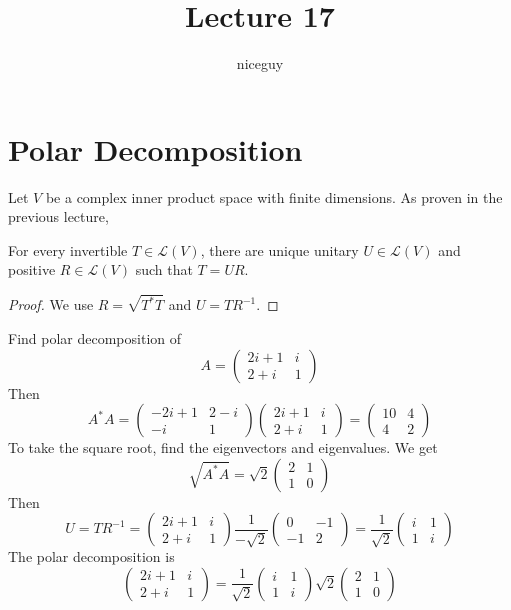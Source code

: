 \documentclass[12pt]{article}
\author{niceguy}
\title{Lecture 17}
\begin{document}
\maketitle

\section{Polar Decomposition}

Let $V$ be a complex inner product space with finite dimensions. As proven in the previous lecture,

\begin{thm}
	For every invertible $T \in \mathcal L(V)$, there are unique unitary $U \in \mathcal L(V)$ and positive $R \in \mathcal L(V)$ such that $T=UR$.
\end{thm}

\begin{proof}
	We use $R=\sqrt{T^*T}$ and $U=TR^{-1}$.
\end{proof}

\begin{ex}
	Find polar decomposition of
	$$A = \begin{pmatrix} 2i+1 & i \\ 2+i & 1\end{pmatrix}$$
	Then
	$$A^*A = \begin{pmatrix} -2i+1 & 2-i \\ -i & 1\end{pmatrix}\begin{pmatrix} 2i+1 & i \\ 2+i & 1\end{pmatrix} = \begin{pmatrix} 10 & 4 \\ 4 & 2\end{pmatrix}$$
	To take the square root, find the eigenvectors and eigenvalues. We get
	$$\sqrt{A^*A} = \sqrt{2} \begin{pmatrix} 2 & 1 \\ 1 & 0 \end{pmatrix}$$
	Then
	$$U = TR^{-1} = \begin{pmatrix} 2i+1 & i \\ 2+i & 1 \end{pmatrix}\frac{1}{-\sqrt{2}} \begin{pmatrix} 0 & -1 \\ -1 & 2 \end{pmatrix} = \frac{1}{\sqrt{2}} \begin{pmatrix} i & 1 \\ 1 & i \end{pmatrix}$$
	The polar decomposition is
	$$\begin{pmatrix} 2i+1 & i \\ 2+i & 1 \end{pmatrix} = \frac{1}{\sqrt{2}} \begin{pmatrix} i & 1 \\ 1 & i \end{pmatrix} \sqrt{2} \begin{pmatrix} 2 & 1 \\ 1 & 0 \end{pmatrix}$$
\end{ex}
\end{document}
